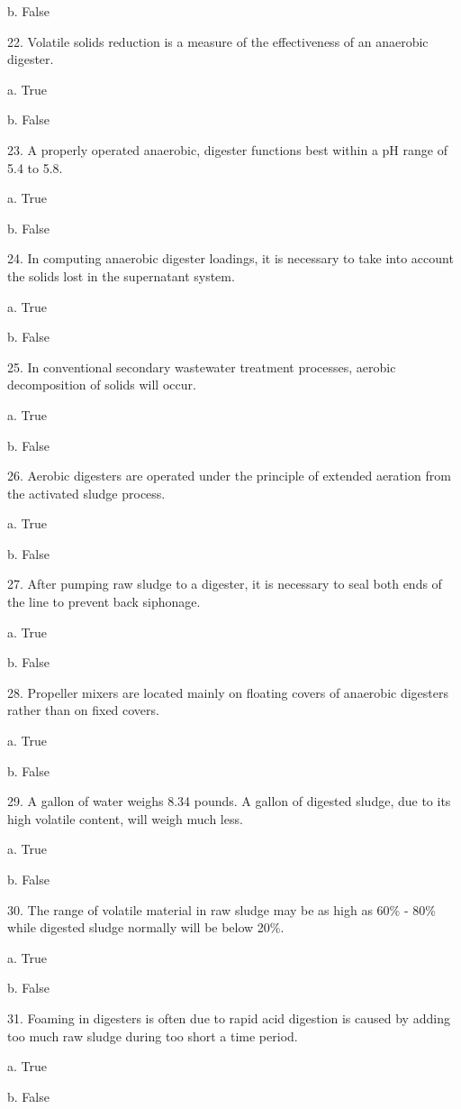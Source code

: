 \documentclass{article}
\begin{document}
b. False 


22. Volatile solids reduction is a measure of the effectiveness of an anaerobic digester. 

a. True 

b. False 


23. A properly operated anaerobic, digester functions best within a pH range of 5.4 to 5.8. 

a. True 

b. False 


24. In computing anaerobic digester loadings, it is necessary to take into account the solids lost in the supernatant system. 

a. True 

b. False 


25. In conventional secondary wastewater treatment processes, aerobic decomposition of solids will occur. 

a. True 

b. False 


26. Aerobic digesters are operated under the principle of extended aeration from the activated sludge process. 

a. True 

b. False 


27. After pumping raw sludge to a digester, it is necessary to seal both ends of the line to prevent back siphonage. 

a. True 

b. False 


28. Propeller mixers are located mainly on floating covers of anaerobic digesters rather than on fixed covers. 

a. True 

b. False 


29. A gallon of water weighs 8.34 pounds. A gallon of digested sludge, due to its high volatile content, will weigh much less. 

a. True 

b. False 


30. The range of volatile material in raw sludge may be as high as 60\% - 80\% while digested sludge normally will be below 20\%. 

a. True 

b. False 


31. Foaming in digesters is often due to rapid acid digestion is caused by adding too much raw sludge during too short a time period. 

a. True 

b. False 
\end{document}
